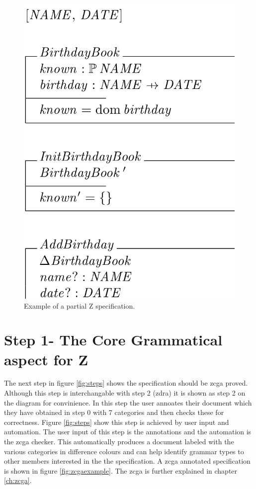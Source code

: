 \begin{figure}[H]
 \begin{center}
 \includegraphics [scale=0.25]{Figures/Design/zspec.png}
 \caption{Example of a partial Z specification.}
 \label{fig:zexample}
\end{center}
\end{figure} 

\section{Step 1- The Core Grammatical aspect for Z}

The next step in figure \ref{fig:steps} shows the specification should be \gls{zcga} proved. Although this step is interchangable with step 2 (\gls{zdra}) it is shown as step 2 on the diagram for convinience. In this step the user annoates their document which they have obtained in step 0 with 7 categories and then checks these for correctness. Figure \ref{fig:steps} show this step is achieved by user input and automation. The user input of this step is the annotations and the automation is the \gls{zcga} checker. This automatically produces a document labeled with the various categories in difference colours and can help identify grammar types to other members interested in the the specification. A \gls{zcga} annotated specification is shown in figure \ref{fig:zcgaexample}. The \gls{zcga} is further explained in chapter \ref{ch:zcga}.

